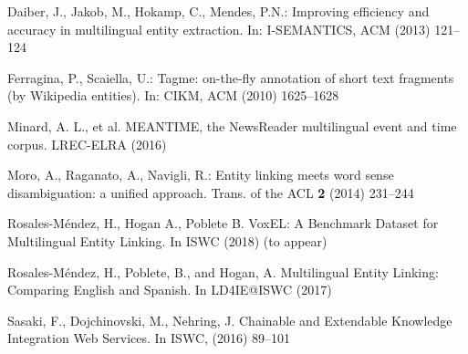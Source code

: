 \documentclass{llncs}
\begin{document}

\begin{thebibliography}{99}

Daiber, J., Jakob, M., Hokamp, C., Mendes, P.N.: Improving efficiency and accuracy in multilingual entity extraction. In: I-SEMANTICS, ACM (2013) 121--124

Ferragina, P., Scaiella, U.: Tagme: on-the-fly annotation of short text fragments (by Wikipedia entities). In: CIKM, ACM (2010) 1625--1628

Minard, A. L., et al. MEANTIME, the NewsReader multilingual event and time corpus. LREC-ELRA (2016)

Moro, A., Raganato, A., Navigli, R.: Entity linking meets word sense disambiguation: a unified approach. Trans. of the ACL \textbf{2} (2014) 231--244

Rosales-Méndez, H., Hogan A., Poblete B. VoxEL: A Benchmark Dataset for Multilingual Entity Linking. In ISWC (2018) (to appear)

Rosales-Méndez, H., Poblete, B., and Hogan, A. Multilingual Entity Linking: Comparing English and Spanish. In LD4IE@ISWC (2017)

Sasaki, F., Dojchinovski, M., Nehring, J. Chainable and Extendable Knowledge Integration Web Services. In ISWC, (2016) 89--101

\end{thebibliography}
\end{document}
